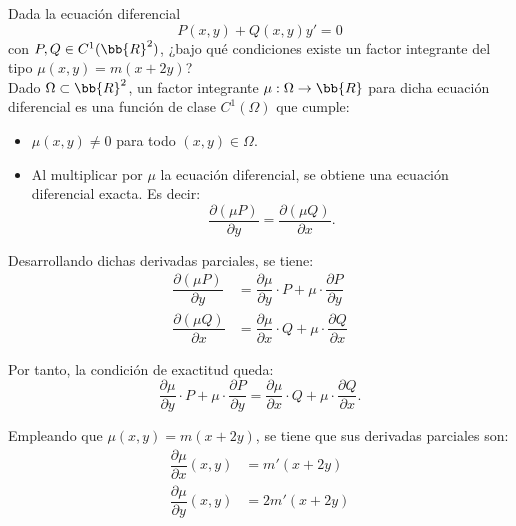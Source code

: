 \documentclass[12pt]{article}
\begin{document}
    \begin{ejercicio}
        Dada la ecuación diferencial
        \begin{equation*}
            P(x, y) + Q(x, y)y' = 0
        \end{equation*}
        con $P, Q \in C^1(\bb{R}^2)$, ¿bajo qué condiciones existe un factor integrante del tipo $\mu(x, y) = m(x + 2y)$?\\

        Dado $\Omega\subset \bb{R}^2$, un factor integrante $\mu: \Omega \to \bb{R}$ para dicha ecuación diferencial es una función de clase $C^1(\Omega)$ que cumple:
        \begin{itemize}
            \item $\mu(x, y) \neq 0$ para todo $(x, y) \in \Omega$.
            \item Al multiplicar por $\mu$ la ecuación diferencial, se obtiene una ecuación diferencial exacta. Es decir:
            \begin{equation*}
                \dfrac{\partial(\mu P)}{\partial y} = \dfrac{\partial(\mu Q)}{\partial x}.
            \end{equation*}
        \end{itemize}

        Desarrollando dichas derivadas parciales, se tiene:
        \begin{align*}
            \dfrac{\partial(\mu P)}{\partial y} &= \dfrac{\partial \mu}{\partial y}\cdot P + \mu\cdot \dfrac{\partial P}{\partial y}\\
            \dfrac{\partial(\mu Q)}{\partial x} &= \dfrac{\partial \mu}{\partial x}\cdot Q + \mu\cdot \dfrac{\partial Q}{\partial x}
        \end{align*}

        Por tanto, la condición de exactitud queda:
        \begin{equation*}
            \dfrac{\partial \mu}{\partial y}\cdot P + \mu\cdot \dfrac{\partial P}{\partial y}
            = \dfrac{\partial \mu}{\partial x}\cdot Q + \mu\cdot \dfrac{\partial Q}{\partial x}.
        \end{equation*}

        Empleando que $\mu(x, y) = m(x + 2y)$, se tiene que sus derivadas parciales son:
        \begin{align*}
            \dfrac{\partial \mu}{\partial x}(x,y) &= m'(x + 2y)\\
            \dfrac{\partial \mu}{\partial y}(x,y) &= 2m'(x + 2y)
        \end{align*}


\end{ejercicio}
\end{document}
